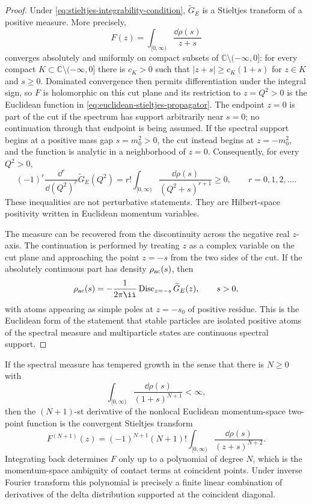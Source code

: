 \begin{proof}
Under \eqref{eq:stieltjes-integrability-condition}, \(\widetilde G_E\) is a
Stieltjes transform of a positive measure.  More precisely,
\[
  F(z)=\int_{[0,\infty)}\frac{\dd\rho(s)}{z+s}
\]
converges absolutely and uniformly on compact subsets of
\(\mathbb C\setminus(-\infty,0]\): for every compact
\(K\subset\mathbb C\setminus(-\infty,0]\) there is \(c_K>0\) such that
\(|z+s|\ge c_K(1+s)\) for \(z\in K\) and \(s\ge0\).  Dominated convergence
then permits differentiation under the integral sign, so \(F\) is holomorphic
on this cut plane and its restriction to \(z=Q^2>0\) is the Euclidean function in
\eqref{eq:euclidean-stieltjes-propagator}.  The endpoint \(z=0\) is part of
the cut if the spectrum has support arbitrarily near \(s=0\); no continuation
through that endpoint is being assumed.  If the spectral support begins at a
positive mass gap \(s=m_0^2>0\), the cut instead begins at \(z=-m_0^2\), and
the function is analytic in a neighborhood of \(z=0\).
Consequently, for every \(Q^2>0\),
\[
  (-1)^r
  \frac{\dd^r}{\dd (Q^2)^r}\widetilde G_E(Q^2)
  =
  r!\int_{[0,\infty)}
  \frac{\dd\rho(s)}{(Q^2+s)^{r+1}}
  \ge0,
  \qquad r=0,1,2,\ldots .
\]
These inequalities are not perturbative statements.  They are Hilbert-space
positivity written in Euclidean momentum variables.

The measure can be recovered from the discontinuity across the negative real
\(z\)-axis.  The continuation is performed by treating \(z\) as a complex
variable on the cut plane and approaching the point \(z=-s\) from the two
sides of the cut.  If the absolutely continuous part has density
\(\rho_{\rm ac}(s)\), then
\[
  \rho_{\rm ac}(s)
  =
  -\frac{1}{2\pi\ii}
  \operatorname{Disc}_{z=-s}\widetilde G_E(z),
  \qquad s>0,
\]
with atoms appearing as simple poles at \(z=-s_0\) of positive residue.  This
is the Euclidean form of the statement that stable particles are isolated
positive atoms of the spectral measure and multiparticle states are continuous
spectral support.
\end{proof}

\begin{proposition}
\label{prop:kallen-lehmann-subtracted-stieltjes-contact-terms}
If the spectral measure has tempered growth in the sense that there is
\(N\ge0\) with
\[
  \int_{[0,\infty)}\frac{\dd\rho(s)}{(1+s)^{N+1}}<\infty ,
\]
then the \((N+1)\)-st derivative of the nonlocal Euclidean momentum-space
two-point function is the convergent Stieltjes transform
\[
  F^{(N+1)}(z)
  =
  (-1)^{N+1}(N+1)!
  \int_{[0,\infty)}\frac{\dd\rho(s)}{(z+s)^{N+2}} .
\]
Integrating back determines \(F\) only up to a polynomial of degree \(N\),
which is the momentum-space ambiguity of contact terms at coincident points.
Under inverse Fourier transform this polynomial is precisely a finite linear
combination of derivatives of the delta distribution supported at the
coincident diagonal.
\end{proposition}

